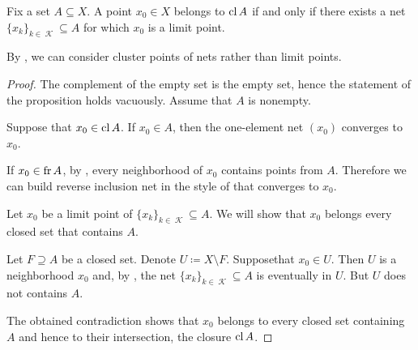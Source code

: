 \begin{proposition}\label{thm:limit_point_iff_in_closure}
  Fix a set \( A \subseteq X \). A point \( x_0 \in X \) belongs to \( \operatorname{cl}{A} \) if and only if there exists a net \( \{ x_k \}_{k \in \mscrK} \subseteq A \) for which \( x_0 \) is a limit point.

  By , we can consider cluster points of nets rather than limit points.
\end{proposition}
\begin{proof}
  The complement of the empty set is the empty set, hence the statement of the proposition holds vacuously. Assume that \( A \) is nonempty.

  \SufficiencySubProof Suppose that \( x_0 \in \operatorname{cl}{A} \). If \( x_0 \in A \), then the one-element net \( (x_0) \) converges to \( x_0 \).

  If \( x_0 \in \operatorname{fr}{A} \), by , every neighborhood of \( x_0 \) contains points from \( A \). Therefore we can build reverse inclusion net in the style of  that converges to \( x_0 \).

  \NecessitySubProof Let \( x_0 \) be a limit point of \( \{ x_k \}_{k \in \mscrK} \subseteq A \). We will show that \( x_0 \) belongs every closed set that contains \( A \).

  Let \( F \supseteq A \) be a closed set. Denote \( U \coloneqq X \setminus F \). Suppose\DNE that \( x_0 \in U \). Then \( U \) is a neighborhood \( x_0 \) and, by , the net \( \{ x_k \}_{k \in \mscrK} \subseteq A \) is eventually in \( U \). But \( U \) does not contains \( A \).

  The obtained contradiction shows that \( x_0 \) belongs to every closed set containing \( A \) and hence to their intersection, the closure \( \operatorname{cl} A \).
\end{proof}

